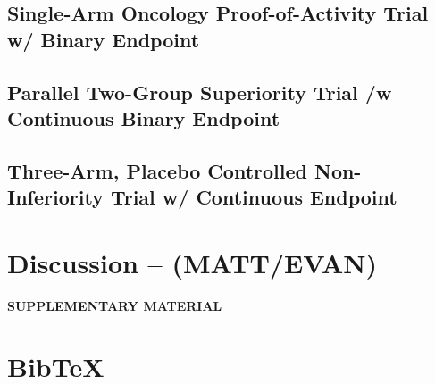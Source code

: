 \documentclass[12pt]{article}
\begin{document}
\subsection{Single-Arm Oncology Proof-of-Activity Trial w/ Binary Endpoint}

\subsection{Parallel Two-Group Superiority Trial /w Continuous Binary Endpoint}

\subsection{Three-Arm, Placebo Controlled Non-Inferiority Trial w/ Continuous Endpoint}

\section{Discussion -- (MATT/EVAN)}

%
%
%
%
%				
%
%


%
			
	

\newpage
\begin{center}
{\large\bf SUPPLEMENTARY MATERIAL}
\end{center}


\section{BibTeX}

 
 		
\end{document}
